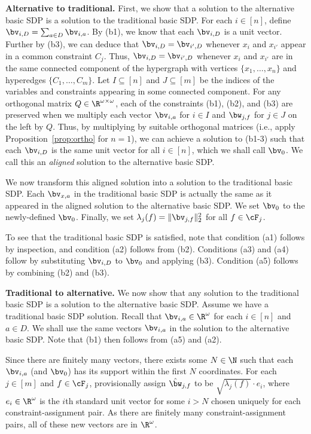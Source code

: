 \medskip\textbf{Alternative to traditional.} First, we show that a solution to the alternative basic SDP is a solution to the traditional basic SDP. For each ${i \in [n]}$, define ${\bv_{i,D} = \sum_{a \in D} \bv_{i,a}}$. By (b1), we know that each ${\bv_{i,D}}$ is a unit vector. Further by (b3), we can deduce that ${\bv_{i,D} = \bv_{i',D}}$ whenever ${x_i}$ and ${x_{i'}}$ appear in a common constraint ${C_j}$. Thus, ${\bv_{i,D} = \bv_{i',D}}$ whenever ${x_i}$ and ${x_{i'}}$ are in the same connected component of the {hypergraph with vertices $\{x_1, \hdots, x_n\}$ and hyperedges $\{C_1, \hdots, C_m\}$}. {Let $I \subseteq [n]$ and $J \subseteq [m]$ be the indices of the variables and constraints appearing in some connected component. For any orthogonal matrix $Q \in \R^{\omega \times \omega}$,} each of the constraints (b1), (b2), and (b3) are preserved when we {multiply each vector $\bv_{i,a}$ for $i \in I$ and $\bw_{j,f}$ for $j \in J$ on the left by $Q$.} Thus, by {multiplying by suitable orthogonal matrices (i.e., apply Proposition~\ref{prop:ortho} for $n=1$)}, we can achieve a solution to (b1-3) such that {each $\bv_{i,D}$} is the same unit vector for all ${i \in [n]}$, which we shall call ${\bv_0}$. {We call this an \emph{aligned} solution to the alternative basic SDP.}

{We now transform this aligned solution into a solution to the traditional basic SDP. Each $\bv_{x,a}$ in the traditional basic SDP is actually the same as it appeared in the aligned solution to the alternative basic SDP. We set $\bv_0$ to the newly-defined $\bv_0$. Finally, we set $\lambda_j(f) = \|\bv_{j,f}\|_2^2$ for all $f \in \cF_j$.}

To see that the traditional basic SDP is satisfied, note that condition (a1) follows by inspection, and condition (a2) follows from (b2). {Conditions (a3) and (a4) follow} by substituting ${\bv_{i,D}}$ to ${\bv_0}$ and applying (b3). Condition {(a5)} follows {by} combining (b2) and (b3).

\medskip\textbf{Traditional to alternative.} We now show that any solution to the traditional basic SDP is a solution to the alternative basic SDP. Assume we have a traditional basic SDP solution. Recall that ${\bv_{i,a}} \in \R^\omega$ {for each $i \in [n]$ and $a \in D$}. We shall use the same vectors ${\bv_{i,a}}$ in {the solution to the alternative basic SDP}. Note that (b1) then follows from {(a5)} and (a2). 

Since there are finitely many vectors, there exists some $N \in \N$ such that each ${\bv_{i,a}}$ {(and $\bv_0$)} has its support within the first $N$ coordinates. {For each $j \in [m]$ and $f \in \cF_j$, p}rovisionally assign ${\hat{\bw}_{j,f}}$ to be $\sqrt{\lambda_{{j}}({f})} \cdot e_i$, where {$e_i \in \R^{\omega}$ is the $i$th standard unit vector for some $i > N$} chosen uniquely for each constraint-assignment pair. As there are finitely many constraint-assignment pairs, all of these {new vectors} are in $\R^{\omega}$.

